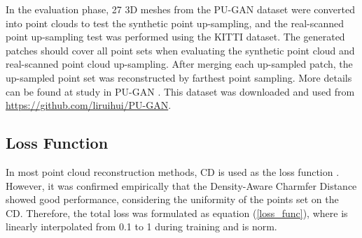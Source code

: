\documentclass{article}
\begin{document}
 \quad In the evaluation phase, 27 3D meshes from the PU-GAN dataset were converted into point clouds to test the synthetic point up-sampling, and the real-scanned point up-sampling test was performed using the KITTI dataset. The generated patches should cover all point sets when evaluating the synthetic point cloud and real-scanned point cloud up-sampling. After merging each up-sampled patch, the up-sampled point set was reconstructed by farthest point sampling. More details can be found at study in PU-GAN \cite{li2019pu}. This dataset was downloaded and used from \url{https://github.com/liruihui/PU-GAN}.

\subsection{Loss Function} 
 \quad In most point cloud reconstruction methods, CD is used as the loss function \cite{nguyen2019graphx,wen2020point,yu2021pointr}. However, it was confirmed empirically that the Density-Aware Charmfer Distance showed good performance, considering the uniformity of the points set on the CD. Therefore, the total loss was formulated as equation (\ref{loss_func}), where  is linearly interpolated from 0.1 to 1 during training and  is  norm.
 
\begin{center}

\end{center}
\end{document}
